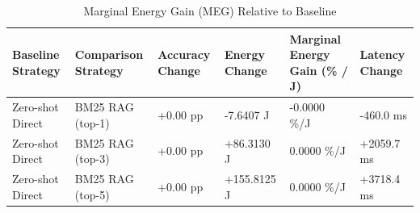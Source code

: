 \begin{table}
\caption{Marginal Energy Gain (MEG) Relative to Baseline}
\label{tab:marginal_energy_gain}
\begin{tabular}{llllll}
\toprule
Baseline Strategy & Comparison Strategy & Accuracy Change & Energy Change & Marginal Energy Gain (\% / J) & Latency Change \\
\midrule
Zero-shot Direct & BM25 RAG (top-1) & +0.00 pp & -7.6407 J & -0.0000 \%/J & -460.0 ms \\
Zero-shot Direct & BM25 RAG (top-3) & +0.00 pp & +86.3130 J & 0.0000 \%/J & +2059.7 ms \\
Zero-shot Direct & BM25 RAG (top-5) & +0.00 pp & +155.8125 J & 0.0000 \%/J & +3718.4 ms \\
\bottomrule
\end{tabular}
\end{table}
